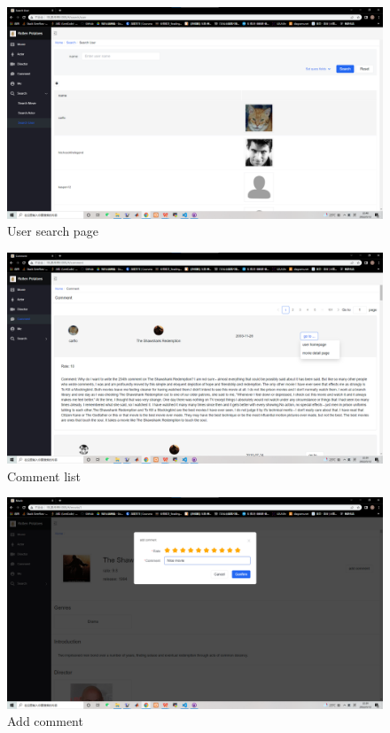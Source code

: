 \begin{CJK*}{UTF8}{gbsn}
    \begin{figure}[htbp]
    \centering
    \includegraphics[width=1\textwidth]{res_search9.png}
    \caption{User search page}
    \end{figure}
    
    \begin{figure}[htbp]
    \centering
    \includegraphics[width=1\textwidth]{res_comment1.png}
    \caption{Comment list}
    \end{figure}
    
    \begin{figure}[htbp]
    \centering
    \includegraphics[width=1\textwidth]{res_comment2.png}
    \caption{Add comment}
    \end{figure}
    

\end{CJK*}
